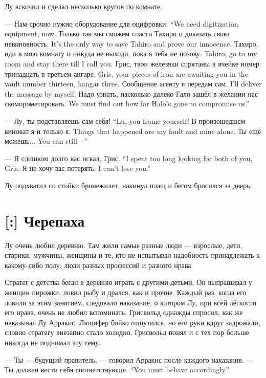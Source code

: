 Лу вскочил и сделал несколько кругов по комнате.

{--- Нам срочно нужно оборудование для оцифровки.}
{``We need digitization equipment, now.}
{Только так мы сможем спасти Тахиро и доказать свою невиновность.}
{It's the only way to save Tahiro and prove our innocence.}
{Тахиро, иди в мою комнату и никуда не выходи, пока я тебя не позову.}
{Tahiro, go to my room and stay there till I call you.}
{Грис, твои железяки спрятаны в ячейке номер тринадцать в третьем ангаре.}
{Gris, your pieces of iron are awaiting you in the vault number thirteen, hangar three.}
{Сообщение агенту я передам сам.}
{I'll deliver the message by myself.}
{Надо узнать, насколько далеко Гало зашёл в желании нас скомпрометировать.}
{We must find out how far Halo's gone to compromise us.''}

{--- Лу, ты подставляешь сам себя!}
{``Lu, you frame yourself!}
{В произошедшем виноват я и только я.}
{Things that happened are my fault and mine alone.}
{Ты ещё можешь...}
{You can still---''}

{--- Я слишком долго вас искал, Грис.}
{``I spent too long looking for both of you, Gris.}
{Я не хочу вас потерять.}
{I can't lose you.''}

Лу подхватил со стойки бронежилет, накинул плащ и бегом бросился за дверь.

\section{[:] Черепаха}

\textspace

Лу очень любил деревню.
Там жили самые разные люди --- взрослые, дети, старики, мужчины, женщины и те, кто не испытывал надобность принадлежать к какому-либо полу, люди разных профессий и разного нрава.

Стратег с детства бегал в деревню играть с другими детьми.
Он выпрашивал у женщин пирожки, ловил рыбу и дрался, как и прочие.
Каждый раз, когда его ловили за этим занятием, следовало наказание, о котором Лу, при всей лёгкости его нрава, очень не любил вспоминать.
Грисвольд однажды спросил, как же наказывал Лу Арракис.
Люцифер бойко отшутился, но его руки вдруг задрожали, словно стратегу внезапно стало холодно.
Грисвольд понял и с тех пор больше никогда не поднимал эту тему.

--- Ты --- будущий правитель, --- говорил Арракис после каждого наказания.
{--- Ты должен вести себя соответствующе.}
{``You must behave accordingly.''}

